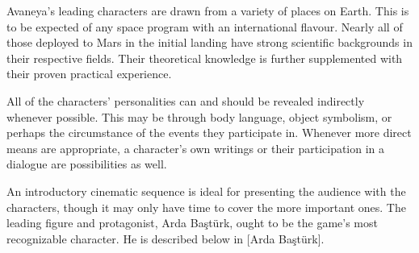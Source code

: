 

Avaneya's leading characters are drawn from a variety of places on Earth. This is to be expected of any space program with an international flavour. Nearly all of those deployed to Mars in the initial landing have strong scientific backgrounds in their respective fields. Their theoretical knowledge is further supplemented with their proven practical experience.

All of the characters' personalities can and should be revealed indirectly whenever possible. This may be through body language, object symbolism, or perhaps the circumstance of the events they participate in. Whenever more direct means are appropriate, a character's own writings or their participation in a dialogue are possibilities as well.

An introductory cinematic sequence is ideal for presenting the audience with the characters, though it may only have time to cover the more important ones. The leading figure and protagonist, Arda Baştürk, ought to be the game's most recognizable character. He is described below in [Arda Baştürk].

\page


\page


\page


\page


\page


\page


\StopChapter

